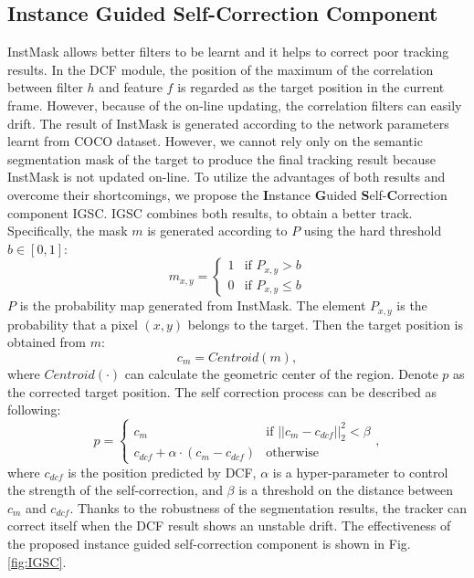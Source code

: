 \documentclass[review]{elsarticle}
\begin{document}
\begin{CJK*}{UTF8}{gbsn}
\subsection{Instance Guided Self-Correction Component} \label{sec:cog}
InstMask allows better filters to be learnt and it helps to correct poor tracking results.
In the DCF module, the position of the maximum of the correlation between filter $h$ and feature $f$ is regarded as the target position in the current frame. However, because of the on-line updating, the correlation filters can easily drift.
The result of InstMask is generated according to the network parameters learnt from COCO dataset. However, we cannot rely only on the semantic segmentation mask of the target to produce the final tracking result because InstMask is not updated on-line.
To utilize the advantages of both results and overcome their shortcomings, we propose the \textbf{I}nstance \textbf{G}uided \textbf{S}elf-\textbf{C}orrection component IGSC. IGSC combines both results, to obtain a better track. Specifically, the mask $m$ is generated according to $P$ using the hard threshold $b \in [0, 1] $:
\begin{equation}
m_{x,y} = \left\{ \begin{array}{ll}
 1 & \textrm{if $P_{x,y} > b$}\\
 0 & \textrm{if $P_{x,y} \le b$}
 \end{array} \right.
\end{equation}
$P$ is the probability map generated from InstMask. The element $P_{x,y}$ is the probability that a pixel $(x,y)$ belongs to the target.
Then the target position is obtained from $m$:
\begin{equation}
c_{m} = Centroid(m),
\end{equation}
where $Centroid(\mathord{\cdot})$ can calculate the geometric center of the region.
Denote $p$ as the corrected target position.
The self correction process can be described as following:
\begin{equation}
p = \left\{ \begin{array}{ll}
 c_{m} & \textrm{if $||c_{m}-c_{dcf}||_2^2 < \beta$}\\
 c_{dcf} + \alpha \cdot (c_{m}-c_{dcf}) & \textrm{otherwise}
 \end{array} \right.,
\end{equation}
where $c_{dcf}$ is the position predicted by DCF, $\alpha$ is a hyper-parameter to control the strength of the self-correction, and $\beta$ is a threshold on the distance between $c_{m}$ and $c_{dcf}$.
Thanks to the robustness of the segmentation results, the tracker can correct itself when the DCF result shows an unstable drift. The effectiveness of the proposed instance guided self-correction component is shown in Fig. \ref{fig:IGSC}.


\end{CJK*}
\end{document}
